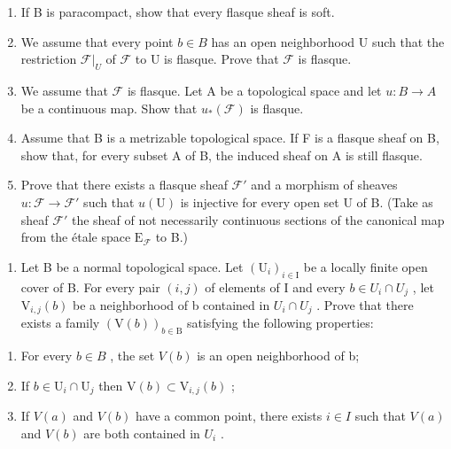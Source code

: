 \begin{enumerate}
\def\labelenumi{\alph{enumi})}
\item
  If B is paracompact, show that every flasque sheaf is soft.
\item
  We assume that every point \(b \in B\) has an open neighborhood U such that the restriction \(\mathcal{F}|_{U}\) of \(\mathcal{F}\) to U is flasque. Prove that \(\mathcal{F}\) is flasque.
\item
  We assume that \(\mathcal{F}\) is flasque. Let A be a topological space and let \(u\colon B\to A\) be a continuous map. Show that \(u_{*}(\mathcal{F})\) is flasque.
\item
  Assume that B is a metrizable topological space. If F is a flasque sheaf on B, show that, for every subset A of B, the induced sheaf on A is still flasque.
\item
  Prove that there exists a flasque sheaf \(\mathcal{F}'\) and a morphism of sheaves \(u\colon \mathcal{F}\to \mathcal{F}'\) such that \(u(\mathrm{U})\) is injective for every open set U of B. (Take as sheaf \(\mathcal{F}'\) the sheaf of not necessarily continuous sections of the canonical map from the étale space \(\mathrm{E}_{\mathcal{F}}\) to B.)
\end{enumerate}

\begin{enumerate}
\def\labelenumi{\arabic{enumi})}
\setcounter{enumi}{6}
\tightlist
\item
  Let B be a normal topological space. Let \((\mathrm{U}_{i})_{i\in\mathrm{I}}\) be a locally finite open cover of B. For every pair \((i,j)\) of elements of I and every \(b\in U_{i}\cap U_{j}\) , let \(\mathrm{V}_{i,j}(b)\) be a neighborhood of b contained in \(U_{i}\cap U_{j}\) . Prove that there exists a family \((\mathrm{V}(b))_{b\in\mathrm{B}}\) satisfying the following properties:
\end{enumerate}

\begin{enumerate}
\def\labelenumi{(\roman{enumi})}
\item
  For every \(b \in B\) , the set \(V(b)\) is an open neighborhood of b;
\item
  If \(b \in \mathrm{U}_i \cap \mathrm{U}_j\) then \(\mathrm{V}(b) \subset \mathrm{V}_{i,j}(b)\) ;
\item
  If \(V(a)\) and \(V(b)\) have a common point, there exists \(i \in I\) such that \(V(a)\) and \(V(b)\) are both contained in \(U_i\) .
\end{enumerate}

